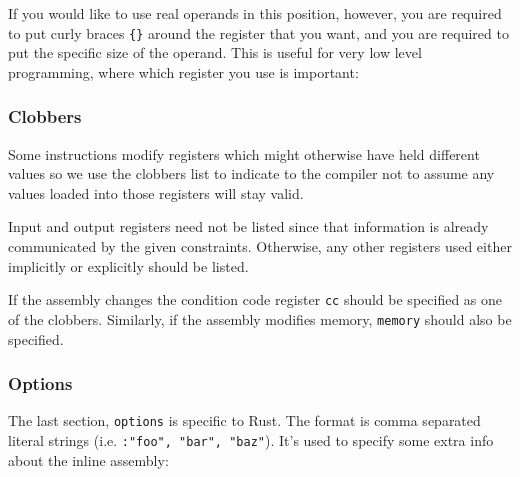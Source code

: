 \documentclass[a4paper,]{book}
\newenvironment{Shaded}{\begin{snugshade}}{\end{snugshade}}
\newcommand{\KeywordTok}[1]{\textcolor[rgb]{0.13,0.29,0.53}{\textbf{{#1}}}}
\newcommand{\DataTypeTok}[1]{\textcolor[rgb]{0.13,0.29,0.53}{{#1}}}
\newcommand{\StringTok}[1]{\textcolor[rgb]{0.31,0.60,0.02}{{#1}}}
\newcommand{\CommentTok}[1]{\textcolor[rgb]{0.56,0.35,0.01}{\textit{{#1}}}}
\newcommand{\PreprocessorTok}[1]{\textcolor[rgb]{0.56,0.35,0.01}{\textit{{#1}}}}
\newcommand{\NormalTok}[1]{{#1}}
\begin{document}
If you would like to use real operands in this position, however, you
are required to put curly braces \texttt{\{\}} around the register that
you want, and you are required to put the specific size of the operand.
This is useful for very low level programming, where which register you
use is important:

\begin{Shaded}
\end{Shaded}

\subsubsection{Clobbers}\label{clobbers}

Some instructions modify registers which might otherwise have held
different values so we use the clobbers list to indicate to the compiler
not to assume any values loaded into those registers will stay valid.

\begin{Shaded}
\end{Shaded}

Input and output registers need not be listed since that information is
already communicated by the given constraints. Otherwise, any other
registers used either implicitly or explicitly should be listed.

If the assembly changes the condition code register \texttt{cc} should
be specified as one of the clobbers. Similarly, if the assembly modifies
memory, \texttt{memory} should also be specified.

\subsubsection{Options}\label{options}

The last section, \texttt{options} is specific to Rust. The format is
comma separated literal strings (i.e. \texttt{:"foo",\ "bar",\ "baz"}).
It's used to specify some extra info about the inline assembly:
\end{document}
